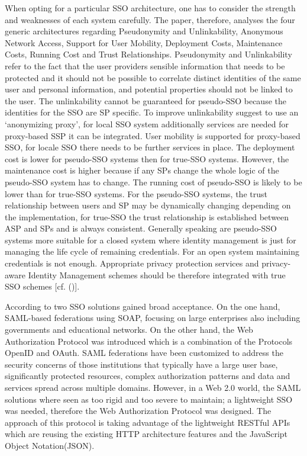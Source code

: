 {{When opting for a particular SSO architecture, one has to consider the strength and weaknesses of each system carefully. The paper, therefore, analyses the four generic architectures regarding Pseudonymity and Unlinkability, Anonymous Network Access, Support for User Mobility, Deployment Costs, Maintenance Costs, Running Cost and Trust Relationships. Pseudonymity and Unlinkability refer to the fact that the user providers sensible information that needs to be protected and it should not be possible to correlate distinct identities of the same user and personal information, and potential properties should not be linked to the user. The unlinkability cannot be guaranteed for pseudo-SSO because the identities for the SSO are SP specific. To improve unlinkability   \cite{Pashalidis:2003:10.1007/3-540-45067-X_22} suggest to use an ‘anonymizing proxy’, for local SSO system additionally services are needed for proxy-based SSP it can be integrated. User mobility is supported for proxy-based SSO, for locale SSO there needs to be further services in place. The deployment cost is lower for pseudo-SSO systems then for true-SSO systems. However, the maintenance cost is higher because if any SPs change the whole logic of the pseudo-SSO system has to change. The running cost of pseudo-SSO is likely to be lower than for true-SSO systems. For the pseudo-SSO systems, the trust relationship between users and SP may be dynamically changing depending on the implementation, for true-SSO the trust relationship is established between ASP and SPs and is always consistent. Generally speaking are pseudo-SSO systems more suitable for a closed system where identity management is just for managing the life cycle of remaining credentials. For an open system maintaining credentials is not enough. Appropriate privacy protection services and privacy-aware Identity Management schemes should be therefore integrated with true SSO schemes [cf. (\cite{Pashalidis:2003:10.1007/3-540-45067-X_22})]. 


According to \cite{Lynch:2017:IIG} two SSO solutions gained broad acceptance. On the one hand, SAML-based federations using SOAP, focusing on large enterprises also including governments and educational networks. On the other hand, the Web Authorization Protocol was introduced which is a combination of the Protocols OpenID and OAuth. SAML federations have been customized to address the security concerns of those institutions that typically have a large user base, significantly protected resources, complex authorization patterns and data and services spread across multiple domains. However, in a Web 2.0 world, the SAML solutions where seen as too rigid and too severe to maintain; a lightweight SSO was needed, therefore the Web Authorization Protocol was designed. The approach of this protocol is taking advantage of the lightweight RESTful APIs which are reusing the existing HTTP architecture features and the JavaScript Object Notation(JSON).

}}
